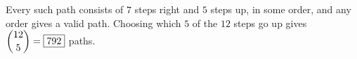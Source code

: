 Every such path consists of $7$ steps right and $5$ steps up, in some order, and any order gives a valid path. Choosing which $5$ of the $12$ steps go up gives $\dbinom{12}{5}=\boxed{792}$ paths.
